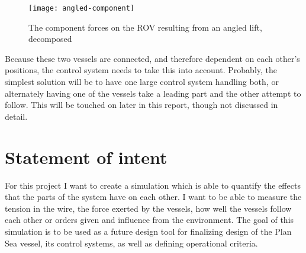 \begin{figure}
	\centering
	\texttt{[image: angled-component]}
	\caption{The component forces on the ROV resulting from an angled lift, decomposed}
	\label{fig:angled-force}
\end{figure}

Because these two vessels are connected, and therefore dependent on each other's positions, the control system needs to take this into account. Probably, the simplest solution will be to have one large control system handling both, or alternately having one of the vessels take a leading part and the other attempt to follow. This will be touched on later in this report, though not discussed in detail.

\section{Statement of intent}
For this project I want to create a simulation which is able to quantify the effects that the parts of the system have on each other. I want to be able to measure the tension in the wire, the force exerted by the vessels, how well the vessels follow each other or orders given and influence from the environment. The goal of this simulation is to be used as a future design tool for finalizing design of the Plan Sea vessel, its control systems, as well as defining operational criteria. 